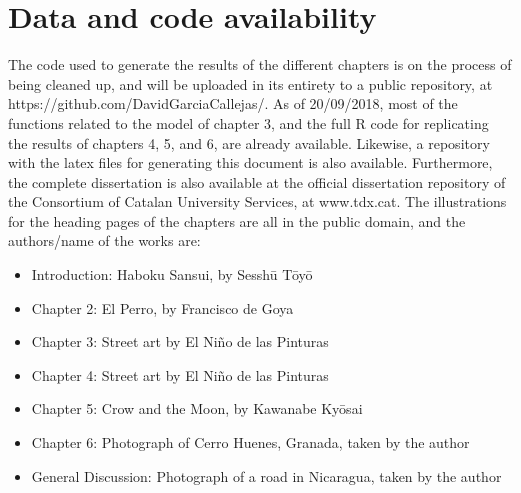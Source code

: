 \documentclass[10pt,a4paper,twoside,fleqn,showtrims]{memoir}
\begin{document}
\section*{Data and code availability}

The code used to generate the results of the different chapters is on the process of being cleaned up, and will be uploaded in its entirety to a public repository, at https://github.com/DavidGarciaCallejas/. As of 20/09/2018, most of the functions related to the model of chapter 3, and the full R code for replicating the results of chapters 4, 5, and 6, are already available. Likewise, a repository with the latex files for generating this document is also available. Furthermore, the complete dissertation is also available at the official dissertation repository of the Consortium of Catalan University Services, at www.tdx.cat. The illustrations for the heading pages of the chapters are all in the public domain, and the authors/name of the works are:

\begin{itemize}
\item Introduction: Haboku Sansui, by Sesshū Tōyō
\item Chapter 2: El Perro, by Francisco de Goya
\item Chapter 3: Street art by El Niño de las Pinturas
\item Chapter 4: Street art by El Niño de las Pinturas
\item Chapter 5: Crow and the Moon, by Kawanabe Kyōsai
\item Chapter 6: Photograph of Cerro Huenes, Granada, taken by the author
\item General Discussion: Photograph of a road in Nicaragua, taken by the author
\end{itemize}

\clearpage


\tableofcontents* %

\clearpage

\listoffigures %
\end{document}
